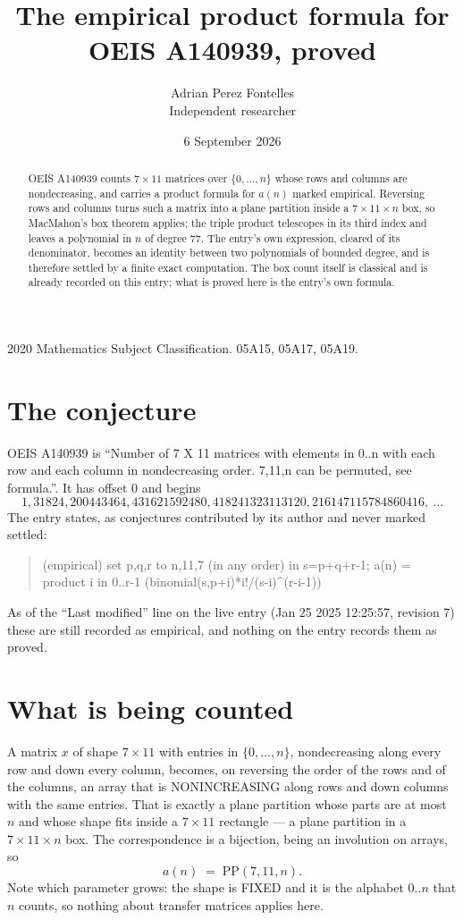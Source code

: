 \documentclass[11pt,a4paper]{article}
\title{The empirical product formula for OEIS A140939, proved}
\author{Adrian Perez Fontelles\\ \small Independent researcher}
\date{6 September 2026}
\theoremstyle{plain}
\theoremstyle{definition}
\begin{document}
\maketitle

\begin{abstract}
OEIS A140939 counts $7\times11$ matrices over $\{0,\dots,n\}$ whose rows and columns are
nondecreasing, and carries a product formula for $a(n)$ marked empirical. Reversing rows and
columns turns such a matrix into a plane partition inside a $7\times11\times n$ box, so
MacMahon's box theorem applies; the triple product telescopes in its third index and leaves a
polynomial in $n$ of degree $77$. The entry's own expression, cleared of its denominator,
becomes an identity between two polynomials of bounded degree, and is therefore settled by a
finite exact computation. The box count itself is classical and is already recorded on this
entry; what is proved here is the entry's own formula.
\end{abstract}

\noindent\small 2020 Mathematics Subject Classification. 05A15, 05A17, 05A19.\normalsize

\section{The conjecture}

OEIS A140939 is ``Number of 7 X 11 matrices with elements in 0..n with each row and each column in nondecreasing order. 7,11,n can be permuted, see formula.''. It has offset $0$ and begins
\[
1, 31824, 200443464, 431621592480, 418241323113120, 216147115784860416,\ \dots
\]
The entry states, as conjectures contributed by its author and never marked settled:
\begin{quote}
(empirical) set p,q,r to n,11,7 (in any order) in s=p+q+r-1; a(n) = product {i in 0..r-1} (binomial(s,p+i)*i!/(s-i)\^{}(r-i-1))

\end{quote}
As of the ``Last modified'' line on the live entry (Jan 25 2025 12:25:57, revision 7) these are still
recorded as empirical, and nothing on the entry records them as proved.

\section{What is being counted}

A matrix $x$ of shape $7\times11$ with entries in $\{0,\dots,n\}$, nondecreasing along
every row and down every column, becomes, on reversing the order of the rows and of the
columns, an array that is NONINCREASING along rows and down columns with the same entries. That
is exactly a plane partition whose parts are at most $n$ and whose shape fits inside a
$7\times11$ rectangle --- a plane partition in a $7\times11\times n$ box. The
correspondence is a bijection, being an involution on arrays, so
\[
a(n)\;=\;\mathrm{PP}(7,11,n).
\]
Note which parameter grows: the shape is FIXED and it is the alphabet $0..n$ that $n$ counts,
so nothing about transfer matrices applies here.
\end{document}

